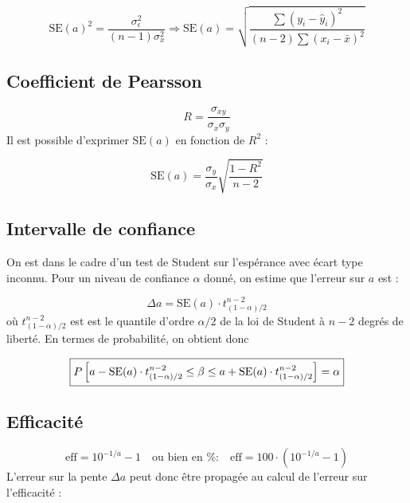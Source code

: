 \documentclass[a4paper,10pt]{article}
\begin{document}
\begin{equation}
 \text{SE}(a)^2 = \dfrac{\sigma_{\epsilon}^2}{(n-1)\sigma_x^2} \Longrightarrow
\boxed{\text{SE}(a) =
\sqrt{\dfrac{\sum(y_i-\hat{y}_i)^2}{
(n-2)\sum (x_i-\bar{x})^2}}}
\end{equation}

\subsection{Coefficient de Pearsson}

\begin{equation}
 R = \dfrac{\sigma_{xy}}{\sigma_x\sigma_y}
\end{equation}
Il est possible d'exprimer $\text{SE}(a)$ en fonction de $R^2$ :

\begin{equation}
 \text{SE}(a) = \dfrac{\sigma_y}{\sigma_x}\sqrt{\dfrac{1-R^2}{n-2}}
\end{equation}


\subsection{Intervalle de confiance}
On est dans le cadre d'un test de Student sur l'espérance avec écart type
inconnu. Pour un niveau de confiance $\alpha$ donné, on estime que l'erreur sur
$a$ est :

\begin{equation}
 \Delta a = \text{SE}(a) \cdot t_{(1-\alpha)/2}^{n-2}
\end{equation}
où $t_{(1-\alpha)/2}^{n-2}$ est est le quantile d'ordre $\alpha/2$ de la loi de
Student à $n-2$ degrés de liberté. En termes de probabilité, on obtient donc

\begin{equation}
\boxed{%
 P\left[a- \text{SE}(a) \cdot t_{(1-\alpha)/2}^{n-2}\le \beta\le a +\text{SE}(a)
\cdot
t_{(1-\alpha)/2}^{n-2}\right] = \alpha}
\end{equation}

\subsection{Efficacité}

\begin{equation}
 \text{eff} = 10^{-1/a}-1\quad \text{ou bien en \%:}\quad \text{eff}
=100\cdot\left(10^{-1/a}-1\right)
\end{equation}
L'erreur sur la pente $\Delta a$ peut donc être propagée au calcul de l'erreur
sur l'efficacité :
\end{document}
